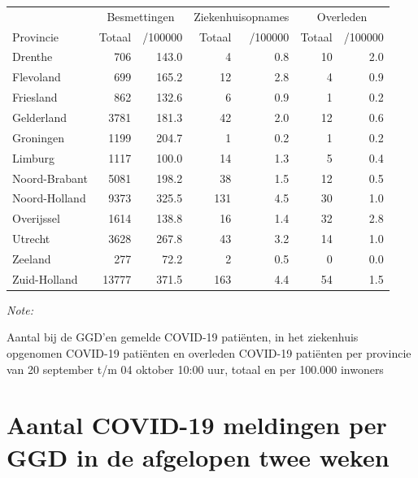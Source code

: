 \documentclass[
  english,
  man,floatsintext]{apa6}
\begin{document}
\begin{table}[H]
\centering
\begin{threeparttable}
\begin{tabular}{lrrrrrr}
\toprule
\multicolumn{1}{c}{ } & \multicolumn{2}{c}{Besmettingen} & \multicolumn{2}{c}{Ziekenhuisopnames} & \multicolumn{2}{c}{Overleden} \\
\cmidrule(l{3pt}r{3pt}){2-3} \cmidrule(l{3pt}r{3pt}){4-5} \cmidrule(l{3pt}r{3pt}){6-7}
Provincie & Totaal & /100000 & Totaal & /100000 & Totaal & /100000\\
\midrule
Drenthe & 706 & 143.0 & 4 & 0.8 & 10 & 2.0\\
Flevoland & 699 & 165.2 & 12 & 2.8 & 4 & 0.9\\
Friesland & 862 & 132.6 & 6 & 0.9 & 1 & 0.2\\
Gelderland & 3781 & 181.3 & 42 & 2.0 & 12 & 0.6\\
Groningen & 1199 & 204.7 & 1 & 0.2 & 1 & 0.2\\
Limburg & 1117 & 100.0 & 14 & 1.3 & 5 & 0.4\\
Noord-Brabant & 5081 & 198.2 & 38 & 1.5 & 12 & 0.5\\
Noord-Holland & 9373 & 325.5 & 131 & 4.5 & 30 & 1.0\\
Overijssel & 1614 & 138.8 & 16 & 1.4 & 32 & 2.8\\
Utrecht & 3628 & 267.8 & 43 & 3.2 & 14 & 1.0\\
Zeeland & 277 & 72.2 & 2 & 0.5 & 0 & 0.0\\
Zuid-Holland & 13777 & 371.5 & 163 & 4.4 & 54 & 1.5\\
\bottomrule
\end{tabular}
\begin{tablenotes}
\item \textit{Note: } 
\item Aantal bij de GGD’en gemelde COVID-19 patiënten, in het ziekenhuis opgenomen COVID-19 patiënten en overleden COVID-19 patiënten per provincie van 20 september t/m 04 oktober 10:00 uur, totaal en per 100.000 inwoners
\end{tablenotes}
\end{threeparttable}
\end{table}

\newpage

\hypertarget{aantal-covid-19-meldingen-per-ggd-in-de-afgelopen-twee-weken}{%
\section{Aantal COVID-19 meldingen per GGD in de afgelopen twee weken}\label{aantal-covid-19-meldingen-per-ggd-in-de-afgelopen-twee-weken}}
\end{document}
